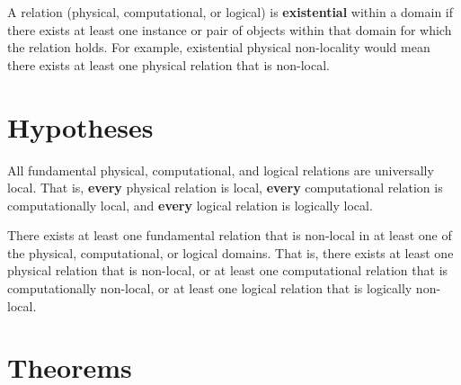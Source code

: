 	\begin{definition}
		A relation (physical, computational, or logical) is \textbf{existential} within a domain if there exists at least one instance or pair of objects within that domain for which the relation holds. For example, existential physical non-locality would mean there exists at least one physical relation that is non-local.
	\end{definition}
	
	\section{Hypotheses}
	
	\begin{hypothesis}
		All fundamental physical, computational, and logical relations are universally local. That is, \textbf{every} physical relation is local, \textbf{every} computational relation is computationally local, and \textbf{every} logical relation is logically local.
	\end{hypothesis}
	
	\begin{hypothesis}
		There exists at least one fundamental relation that is non-local in at least one of the physical, computational, or logical domains. That is, there exists at least one physical relation that is non-local, or at least one computational relation that is computationally non-local, or at least one logical relation that is logically non-local.
	\end{hypothesis}
	
	\section{Theorems}
	
